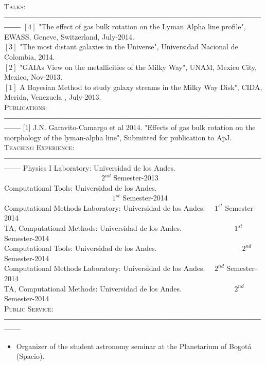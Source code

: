 \documentclass[letterpaper]{article}
\begin{document}
\textsc{\Large Talks:}\\
{\bf---------------------------------------------------------------------------------------------------}
$\left[4\right]$ "The effect of gas bulk rotation on the Lyman Alpha line profile", EWASS, Geneve, Switzerland, July-2014.\\
$\left[3\right]$  "The most distant galaxies in the Universe", Universidad Nacional de Colombia, 2014.\\
$\left[2\right]$ "GAIAs View on the metallicities of the Milky Way", UNAM, Mexico City, Mexico, Nov-2013. \\
$\left[1\right]$  A Bayesian Method to study galaxy streams in the Milky Way Disk", CIDA, Merida, Venezuela , July-2013.\\

\textsc{\Large Publications:}\\
{\bf---------------------------------------------------------------------------------------------------}
[1] J.N. Garavito-Camargo et al 2014. "Effects of gas bulk rotation on the morphology of the lyman-alpha line", Submitted for publication to ApJ.\\

\textsc{\Large Teaching Experience:}\\
{\bf---------------------------------------------------------------------------------------------------}
Physics I Laboratory: Universidad de los Andes. \indent \ \ \ \ \ \ \ \ \ \ \ \ \ \ \ \ \ \ \ \ \ \ \ \ \ \ \ $2^{nd}$ Semester-2013\\
Computational Tools: Universidad de los Andes. \indent \ \ \ \ \ \ \ \ \ \ \ \ \ \ \ \ \ \ \ \ \ \ \ \ \ \ \ \ \ \ $1^{st}$ Semester-2014\\
Computational Methods Laboratory: Universidad de los Andes. \indent  \ \ $1^{st}$ Semester-2014\\
TA, Computational Methods: Universidad de los Andes. \indent \ \ \ \ \ \ \ \ \ \ \ \ \ \   $1^{st}$ Semester-2014\\
Computational Tools: Universidad de los Andes. \indent \ \ \ \ \ \ \ \ \ \ \ \ \ \ \ \ \ \ \ \ \ \ \ $2^{nd}$ Semester-2014\\
Computational Methods Laboratory: Universidad de los Andes. \indent  \ \ $2^{nd}$ Semester-2014\\
TA, Computational Methods: Universidad de los Andes. \indent \ \ \ \ \ \ \ \ \ \ \ \ \ \   $2^{nd}$ Semester-2014\\


\textsc{\Large Public Service:}\\
{\bf---------------------------------------------------------------------------------------------------}
\begin{itemize}
\item Organizer of the student astronomy seminar at the Planetarium of Bogot\'a (Spacio).


\end{itemize}
\end{document}
